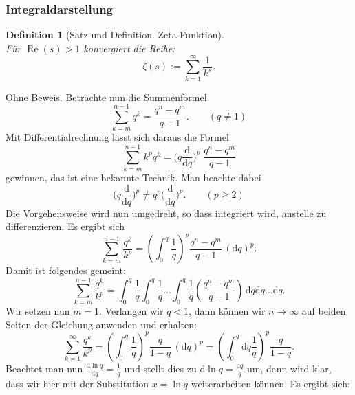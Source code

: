 \documentclass[a4paper,10pt,fleqn,twocolumn,twoside,dvipdfmx]{scrartcl}
\numberwithin{equation}{section}
\DeclareMathOperator{\real}{Re}
\theoremstyle{rmbox}
\newtheorem{definition}{Definition}
\begin{document}
\subsubsection{Integraldarstellung}
\begin{definition}[Satz und Definition. Zeta-Funktion]\mbox{}\\
Für $\real(s)>1$ konvergiert die Reihe:
\begin{equation}
\zeta(s) := \sum_{k=1}^\infty \frac{1}{k^s}.
\end{equation}
\end{definition}
Ohne Beweis. Betrachte nun die Summenformel
\begin{equation}
\sum_{k=m}^{n-1} q^k = \frac{q^n-q^m}{q-1}.\qquad (q\ne 1)
\end{equation}
Mit Differentialrechnung lässt sich daraus die Formel
\begin{equation}
\sum_{k=m}^{n-1} k^p q^k 
= \Big(q\frac{\mathrm d}{\mathrm dq}\Big)^p\;\frac{q^n-q^m}{q-1}
\end{equation}
gewinnen, das ist eine bekannte Technik. Man beachte dabei
\begin{equation}
\Big(q\frac{\mathrm d}{\mathrm dq}\Big)^p
\ne q^p \Big(\frac{\mathrm d}{\mathrm dq}\Big)^p.\qquad (p\ge 2)
\end{equation}
Die Vorgehensweise wird nun umgedreht, so dass integriert wird,
anstelle zu differenzieren. Es ergibt sich%
\begin{equation}
\sum_{k=m}^{n-1} \frac{q^k}{k^p}
= \left(\int_0^q \frac{1}{q}\right)^p \frac{q^n-q^m}{q-1}\,(\mathrm dq)^p.
\end{equation}
Damit ist folgendes gemeint:
\begin{equation}
\sum_{k=m}^{n-1} \frac{q^k}{k^p}
= \int_0^q \frac{1}{q}\int_0^q \frac{1}{q}\ldots\int_0^q \frac{1}{q}
\left(\frac{q^n-q^m}{q-1}\right)\,\mathrm dq\mathrm dq\ldots\mathrm dq.
\end{equation}
Wir setzen nun $m=1$. Verlangen wir $q<1$, dann können wir $n\to\infty$
auf beiden Seiten der Gleichung anwenden und erhalten:%
\begin{equation}
\sum_{k=1}^\infty \frac{q^k}{k^p}
= \left(\int_0^q \frac{1}{q}\right)^p \frac{q}{1-q}\,(\mathrm dq)^p
= \left(\int_0^q \mathrm dq \frac{1}{q}\right)^p \frac{q}{1-q}.
\end{equation}
Beachtet man nun $\frac{\mathrm d\ln q}{\mathrm dq}=\frac{1}{q}$
und stellt dies zu $\mathrm d\ln q = \frac{\mathrm dq}{q}$ um,
dann wird klar, dass wir hier mit der Substitution $x=\ln q$
weiterarbeiten können. Es ergibt sich:%
\end{document}
